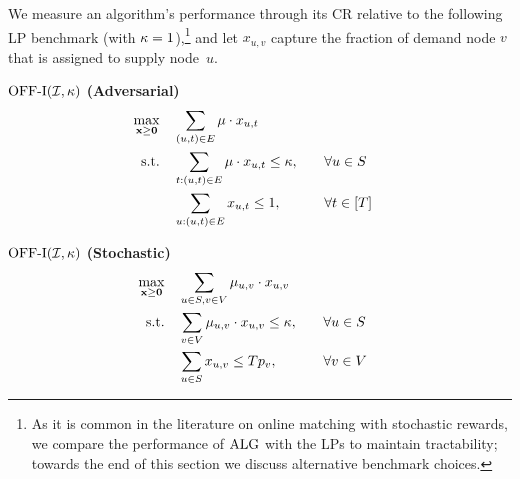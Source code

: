 We measure an algorithm's performance through its CR relative to the following LP benchmark (with $\kappa=1$),\footnote{As it is common in the literature on online matching with stochastic rewards, we  compare the performance of $\mathrm{ALG}$ with the LPs to maintain tractability; towards the end of this section we discuss alternative benchmark choices.}
and let $x_{u, v}$ capture the fraction of demand node $v$ that is assigned to supply node~$u$.
\begin{minipage}[t]{0.47\textwidth}
\centering $\mathrm{\mathrm{OFF}}\textrm{-}\mathrm{I}(\mathcal I,\kappa)$ \textbf{(Adversarial)}
\begin{align}
    \max_{\mathbf{x}\geq \mathbf{0}} \quad & \sum_{(u, t) \in E}{ \mu \cdot x_{u, t}} \notag\\
    \textrm{s.t.} \quad & \sum_{t: (u,t) \in E } \mu \cdot  x_{u, t} \leq \kappa, \quad && \forall u \in S \label{adversarial_lp: kappa-constraint}\\
    & \sum_{u: (u,t) \in E} x_{u, t} \leq 1, \quad && \forall t \in [T] \label{adversarial_lp: demand_constraint}
\end{align}
\end{minipage}%
\hspace{.4em}
\begin{minipage}[t]{0.47\textwidth}
\centering $\mathrm{\mathrm{OFF}}\textrm{-}\mathrm{I}(\mathcal I,\kappa)$ \textbf{(Stochastic)}
\begin{align}
     \max_{\mathbf{x}\geq \mathbf{0}} \quad & \sum_{u\in S, v\in V}{ \mu_{u,v} \cdot x_{u, v}} \notag\\
    \textrm{s.t.} \quad & \sum_{v \in V} \mu_{u,v} \cdot  x_{u, v} \leq \kappa, \quad && \forall u \in S \label{stochastic_lp: kappa-constraint}\\ 
    & \sum_{u \in S} x_{u, v} \leq T p_v, \quad && \forall v \in V \label{stochastic_lp: demand_constraint}
\end{align}
\end{minipage}

